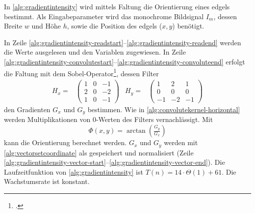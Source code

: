 In \autoref{alg:gradientintensity} wird mittels Faltung die Orientierung eines \glspl{edgel} bestimmt. Als
 Eingabeparameter wird das monochrome Bildsignal $I_m$, dessen Breite $w$ und Höhe $h$, sowie die Position des
 \glspl{edgel} ($x,y$) benötigt.

In Zeile \ref{alg:gradientintensity-readstart}--\ref{alg:gradientintensity-readend} werden die Werte ausgelesen
 und den Variablen zugewiesen. In Zeile
 \ref{alg:gradientintensity-convolutestart}--\ref{alg:gradientintensity-convoluteend} erfolgt die Faltung mit dem
 Sobel-Operator\footcite[Vgl.][S.~120--123]{burger05}, dessen Filter
\begin{subequations}
\begin{align}
	H_x =&
	\begin{pmatrix}
		1& 0& -1\\
		2& 0& -2\\
		1& 0& -1
	\end{pmatrix}
\end{align}
\begin{align}
	H_y =&
	\begin{pmatrix}
		1& 2& 1\\
		0& 0& 0\\
		-1& -2& -1
	\end{pmatrix}
\end{align}
\end{subequations}
den Gradienten $G_x$ und $G_y$ bestimmen. Wie in \autoref{alg:convolutekernel-horizontal} werden Multiplikationen von
 $0$-Werten des Filters vernachlässigt. Mit
\begin{equation}
	\label{eq:orientation}
	\Phi(x,y) = \arctan{\left(\tfrac{G_y}{G_x}\right)}
\end{equation}
kann die Orientierung berechnet werden. $G_x$ und $G_y$ werden mit \autoref{alg:vectorsetcoordinate} als
  gespeichert und normalisiert
 (Zeile \ref{alg:gradientintensity-vector-start}--\ref{alg:gradientintensity-vector-end}). Die Laufzeitfunktion von
 \autoref{alg:gradientintensity} ist $T(n) = 14 \cdot \Theta(1) + 61$. Die Wachstumsrate ist konstant.

